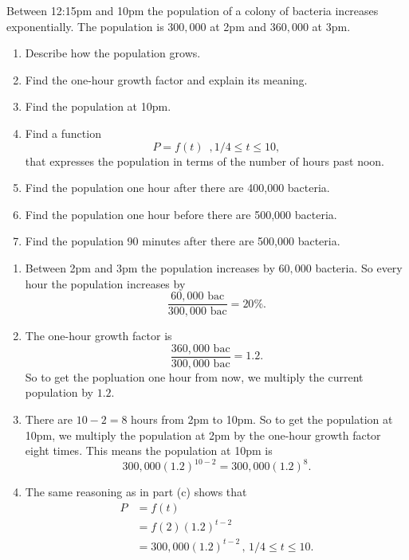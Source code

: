 \documentclass{ximera}
\begin{document}
\begin{example} \label{Ex8mvemaz}

Between 12:15pm and 10pm the population of a colony of bacteria increases exponentially. The population is $300,000$ at 2pm and $360,000$ at 3pm.

\begin{enumerate}
\item Describe how the population grows.

\item Find the one-hour growth factor and explain its meaning.

\item Find the population at 10pm.

\item Find a function 
\[
     P=f(t) \, \, \, , 1/4\leq t \leq 10, 
\]
that expresses the population in terms of the number of hours past noon.

\item Find the population one hour after there are 400,000 bacteria.

\item Find the population one hour before there are 500,000 bacteria.

\item Find the population 90 minutes after there are 500,000 bacteria.
\end{enumerate} 

\begin{explanation}
\begin{enumerate}
\item Between 2pm and 3pm the population increases by $60,000$ bacteria. So every hour the population increases by
\[
     \frac{60,000\text{ bac}}{300,000\text{ bac}} = 20\%.
\]

\item The one-hour growth factor is
\[
 \frac{360,000\text{ bac}}{300,000\text{ bac}} = 1.2 .
\]
So to get the popluation one hour from now, we multiply the current population by $1.2$.

\item There are $10-2 = 8$ hours from 2pm to 10pm. So to get the population at 10pm, we multiply the population at 2pm by the one-hour growth factor eight times. This means the population at 10pm is
\[
   300,000(1.2)^{10-2} = 300,000(1.2)^8.
\]

\item The same reasoning as in part (c) shows that
\begin{align*}
 P &= f(t) \\
    &= f(2) (1.2)^{t-2} \\
    &= 300,000(1.2)^{t-2} \, , \, 1/4\leq t \leq 10 .
\end{align*}


\end{enumerate}
\end{explanation}
\end{example}
\end{document}

